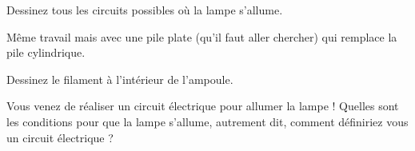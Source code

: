 \documentclass[11pt]{article}
\begin{document}
\begin{question}



\begin{subquestion}{
	Dessinez tous les circuits possibles où la lampe s’allume.
	} %

\end{subquestion}


\begin{subquestion}{
	Même travail mais avec une pile plate (qu'il faut aller chercher) 
	qui remplace la pile cylindrique.
	} 
\end{subquestion}

\begin{subquestion}{
	Dessinez le filament à l’intérieur de l’ampoule.
	} 
\end{subquestion}

\begin{subquestion}{
	Vous venez de réaliser un circuit électrique pour allumer la lampe !
	Quelles sont les conditions pour que la lampe s’allume, autrement dit,
	comment définiriez vous un circuit électrique ?	
	} 

\end{subquestion}

\end{question}
\end{document}
